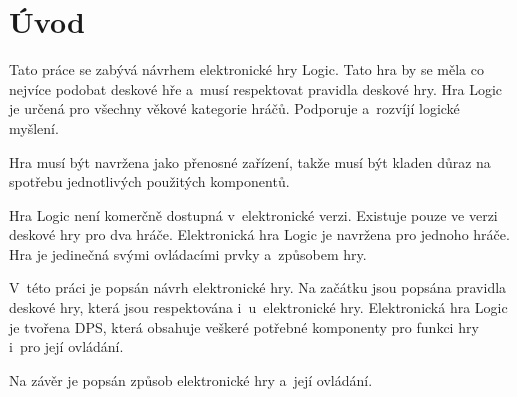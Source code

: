 \chapter*{Úvod}
{}

Tato práce se zabývá návrhem elektronické hry Logic. Tato hra by se měla co nejvíce podobat deskové hře a~musí respektovat pravidla deskové 
hry. Hra Logic je určená pro všechny věkové kategorie hráčů. Podporuje a~rozvíjí logické myšlení. 

Hra musí být navržena jako přenosné zařízení, takže musí být kladen důraz na spotřebu jednotlivých použitých komponentů.

Hra Logic není komerčně dostupná v~elektronické verzi. Existuje pouze ve verzi deskové hry pro dva hráče. Elektronická hra Logic je 
navržena pro jednoho hráče. Hra je jedinečná svými ovládacími prvky a~způsobem hry. 

V~této práci je popsán návrh elektronické hry. Na začátku jsou popsána pravidla deskové hry, která jsou respektována i~u~elektronické hry. 
Elektronická hra Logic je tvořena DPS, která obsahuje veškeré potřebné komponenty pro funkci hry i~pro její ovládání.

Na závěr je popsán způsob elektronické hry a~její ovládání.



